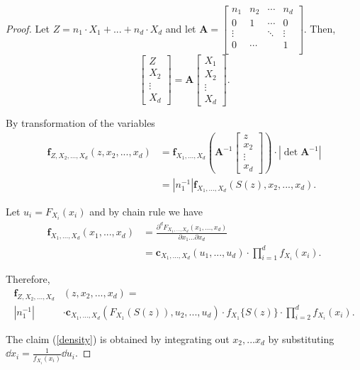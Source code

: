 \begin{proof}
  Let $Z= n_1 \cdot X_1 + ... +  n_d \cdot X_d $ and let
    $\mathbf A=\displaystyle \begin{bmatrix}
      n_1    & n_2   & \cdots & n_d     \\
      0      & 1     &  \cdots & 0       \\
      \vdots &       & \ddots & \vdots \\
      0      & \cdots &       & 1  \\
    \end{bmatrix}$. Then,
    \begin{equation*}
      \begin{bmatrix}
        Z \\ X_2 \\ \vdots \\ X_d
      \end{bmatrix}
      = \bm{A}
      \begin{bmatrix}
         X_1 \\ X_2 \\ \vdots \\ X_d
      \end{bmatrix}.
    \end{equation*}

   By transformation of the variables
   \begin{align*}
      \bm{f}_{Z,X_2,...,X_d}(z, x_2, ...,x_d) &= \bm{f}_{X_1,...,X_d}\left( \bm{A}^{-1}
      \begin{bmatrix}
         z \\ x_2 \\ \vdots \\ x_d
      \end{bmatrix}
      \right)  \cdot |\det \bm{A}^{-1}| \\
      &= \left| n_1^{-1} \right| \bm{f}_{X_1,...,X_d}\left(S(z), x_2,...,x_d\right).
      \end{align*} \medskip

   Let $u_i = F_{X_i}(x_i)$ and by chain rule we have
   \begin{align*}
       \bm{f}_{X_1,...,X_d}(x_1,...,x_d) &= \frac{\partial^d F_{X_1,...,X_d}(x_1, ..., x_d)}{\partial x_1 ... \partial x_d}\\
                                         &= \bm{c}_{X_1,...,X_d}(u_1, ..., u_d) \cdot \prod_{i=1}^d f_{X_i}(x_i).
   \end{align*}

    Therefore,
   \begin{align*}
      \bm{f}_{Z,X_2,...,X_d}&(z, x_2, ...,x_d) = \\
       \left| n_1^{-1} \right| &\cdot
      \bm{c}_{X_1,...,X_d}\left(F_{X_1}( S(z)), u_2, ...,  u_d\right)  \cdot
      f_{X_1} \{ S(z) \} \cdot
      \prod_{i=2}^d f_{X_i}(x_i).
      \end{align*}

   The claim (\ref{density}) is obtained by integrating out $x_2, ... x_d$ by substituting $\dd x_i = \frac{1}{f_{X_i}(x_i)} \dd u_i$.
   \end{proof}

